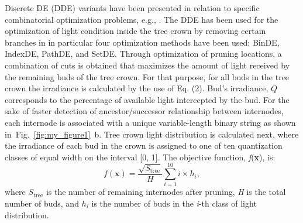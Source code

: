\documentclass[1p]{elsarticle}
\begin{document}
Discrete DE (DDE) variants have been presented in relation to specific
combinatorial optimization problems, e.g., \cite{davendra_flow_2009,pan_discrete_2008,wang_novel_2010}. The DDE has
been used for the optimization of light condition inside the tree crown
by removing certain branches in \cite{strnad_novel_2017} in particular four optimization
methods have been used: BinDE, IndexDE, PathDE, and SetDE. Through
optimization of pruning locations, a combination of cuts is obtained
that maximizes the amount of light received by the remaining buds of the
tree crown. For that purpose, for all buds in the tree crown the
irradiance is calculated by the use of Eq. (2). Bud's irradiance, \(Q\)
corresponds to the percentage of available light intercepted by the bud.
For the sake of faster detection of ancestor/successor relationship
between internodes, each internode is associated with a unique
variable-length binary string as shown in~Fig.~\ref{fig:my_figure1}~b. Tree crown light
distribution is calculated next, where the irradiance of each bud in the
crown is assigned to one of ten quantization classes of equal width on
the interval {[}0, 1{]}. The objective function, \emph{f}(\textbf{x}),
is:
\begin{equation}
 f\left( \mathbf{x} \right) = \frac{\sqrt{S_{\mathrm{\text{tree}}}}}{H}\sum_{i = 1}^{10}{i \times h_{i}}, 
\end{equation}
where \(S_{\mathrm{\text{tree}}}\) is the number of remaining internodes
after pruning, \emph{H} is the total number of buds, and \(h_{i}\) is
the number of buds in the \emph{i}-th class of light distribution.
\end{document}
